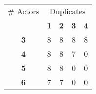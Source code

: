 \begin{tabular}{ | c | c | c | c | c | }
\hline
\# Actors & \multicolumn{4}{|c|}{Duplicates} \\ \cline{2-5}
 & {\bf1} & {\bf2} & {\bf3} & {\bf4} \\ \hline \hline
{\bf 3} & 8 & 8 & 8 & 8 \\ \hline
{\bf 4} & 8 & 8 & 7 & 0 \\ \hline
{\bf 5} & 8 & 8 & 0 & 0 \\ \hline
{\bf 6} & 7 & 7 & 0 & 0 \\ \hline
\end{tabular}
